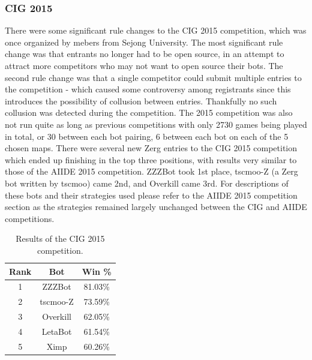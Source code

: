 \documentclass{llncs}
\begin{document}
\subsubsection{CIG 2015}
There were some significant rule changes to the CIG 2015 competition, which was once organized by mebers from Sejong University. The most significant rule change was that entrants no longer had to be open source, in an attempt to attract more competitors who may not want to open source their bots. The second rule change was that a single competitor could submit multiple entries to the competition - which caused some controversy among registrants since this introduces the possibility of collusion between entries. Thankfully no such collusion was detected during the competition. The 2015 competition was also not run quite as long as previous competitions with only 2730 games being played in total, or 30 between each bot pairing, 6 between each bot on each of the 5 chosen maps. There were several new Zerg entries to the CIG 2015 competition which ended up finishing in the top three positions, with results very similar to those of the AIIDE 2015 competition. ZZZBot took 1st place, tscmoo-Z (a Zerg bot written by tscmoo) came 2nd, and Overkill came 3rd. For descriptions of these bots and their strategies used please refer to the AIIDE 2015 competition section as the strategies remained largely unchanged between the CIG and AIIDE competitions. 

\begin{table}[t]
\caption{Results of the CIG 2015 competition.}
\label{tab:cig2015}
\centering
\begin{tabular}{|c|c|c|}
\hline
{\bfseries Rank} & {\bfseries Bot} & {\bfseries Win \%} \\
\hline
1 & ZZZBot & 81.03\% \\
2 & tscmoo-Z & 73.59\% \\
3 & Overkill & 62.05\% \\
4 & LetaBot & 61.54\% \\
5 & Ximp & 60.26\% \\ 
\hline
\end{tabular}
\end{table}
\end{document}
